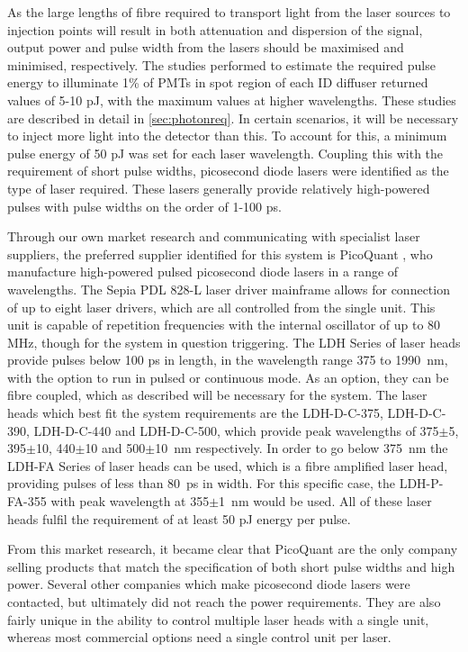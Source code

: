 \documentclass[a4paper,11pt]{article}
\begin{document}
As the large lengths of fibre required to transport light from the laser sources to injection points will result in both attenuation and dispersion of the signal, output power and pulse width from the lasers should be maximised and minimised, respectively. The studies performed to estimate the required pulse energy to illuminate 1\% of PMTs in spot region of each ID diffuser returned values of 5-10 pJ, with the maximum values at higher wavelengths. These studies are described in detail in \cref{sec:photonreq}. In certain scenarios, it will be necessary to inject more light into the detector than this. To account for this, a minimum pulse energy of 50 pJ was set for each laser wavelength. Coupling this with the requirement of short pulse widths, picosecond diode lasers were identified as the type of laser required. These lasers generally provide relatively high-powered pulses with pulse widths on the order of 1-100 ps.

Through our own market research and communicating with specialist laser suppliers, the preferred supplier identified for this system is PicoQuant \cite{bib:picoquant}, who manufacture high-powered pulsed picosecond diode lasers in a range of wavelengths. The Sepia PDL 828-L laser driver mainframe \cite{bib:laserdriver} allows for connection of up to eight laser drivers, which are all controlled from the single unit. This unit is capable of repetition frequencies with the internal oscillator of up to 80 MHz, though for the system in question triggering. The LDH Series of laser heads \cite{bib:laserhead} provide pulses below 100 ps in length, in the wavelength range 375 to 1990~nm, with the option to run in pulsed or continuous mode. As an option, they can be fibre coupled, which as described will be necessary for the system. The laser heads which best fit the system requirements are the LDH-D-C-375, LDH-D-C-390, LDH-D-C-440 and LDH-D-C-500, which provide peak wavelengths of 375$\pm$5, 395$\pm$10, 440$\pm$10 and 500$\pm$10~nm respectively. In order to go below 375~nm the LDH-FA Series of laser heads \cite{bib:LDH} can be used, which is a fibre amplified laser head, providing pulses of less than 80~ps in width. For this specific case, the LDH-P-FA-355 with peak wavelength at 355$\pm$1~nm would be used. All of these laser heads fulfil the requirement of at least 50 pJ energy per pulse.

From this market research, it became clear that PicoQuant are the only company selling products that match the specification of both short pulse widths and high power. Several other companies which make picosecond diode lasers were contacted, but ultimately did not reach the power requirements. They are also fairly unique in the ability to control multiple laser heads with a single unit, whereas most commercial options need a single control unit per laser.
\end{document}
